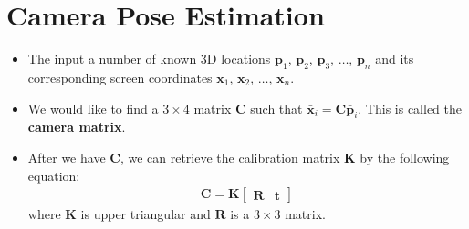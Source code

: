 \documentclass[10pt]{article}
\newcommand{\ve}[1]{\mathbf{#1}}
\begin{document}
  \section{Camera Pose Estimation}\label{sec:camera_pose_estimation} %
  
  \begin{itemize}
    \item The input a number of known 3D locations 
      $\ve{p}_1$, $\ve{p}_2$, $\ve{p}_3$, $\dotsc$, $\ve{p}_n$
      and its corresponding screen coordinates 
      $\ve{x}_1$, $\ve{x}_2$, $\dotsc$, $\ve{x}_n$.
      
    \item We would like to find a $3 \times 4$ matrix $\ve{C}$ such that      
      $\bar{\ve{x}}_i = \ve{C} \bar{\ve{p}}_i$. This is called
      the {\bf camera matrix}.
      
    \item After we have $\ve{C}$, we can retrieve the calibration matrix $\ve{K}$
      by the following equation:
      \begin{align*}
        \ve{C} = \ve{K} \left[ \begin{array}{c|c} \ve{R} & \ve{t} \end{array} \right]
      \end{align*}
      where $\ve{K}$ is upper triangular and $\ve{R}$ is a $3 \times 3$ matrix.
      

\end{itemize}
\end{document}
